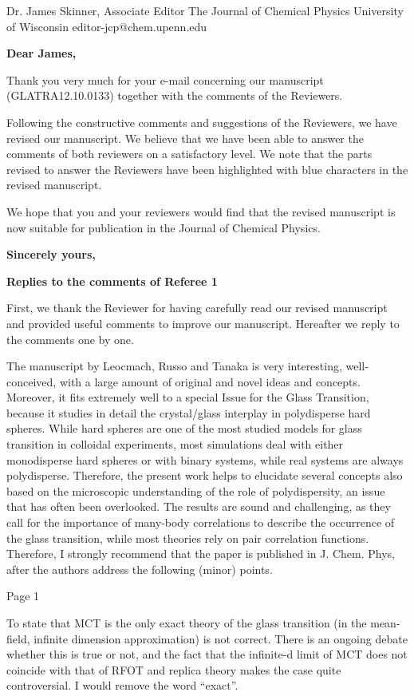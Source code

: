\documentclass[a4paper, rebuttal, parskip=true, firsthead=false, fromemail=true, foldmarks=false]{scrlttr2}
\begin{document}
 
\begin{letter}{Dr. James Skinner, Associate Editor
The Journal of Chemical Physics
University of Wisconsin
editor-jcp@chem.upenn.edu }
\opening{\bf Dear James,}

Thank you very much for your e-mail concerning our manuscript (GLATRA12.10.0133) together with the comments of the Reviewers.

Following the constructive comments and suggestions of the Reviewers, we have revised our manuscript. 
We believe that we have been able to answer the comments of both reviewers on a satisfactory level. We note that the parts revised to answer the Reviewers have been highlighted with blue characters in the revised manuscript. 


We hope that you and your reviewers would find that the revised manuscript is now suitable for publication in the Journal of Chemical Physics. 

\closing{\bf Sincerely yours,} 
\clearpage

\textsf{\textbf{Replies to the comments of Referee 1}}

First, we thank the Reviewer for having carefully read our revised manuscript and provided useful comments to improve our manuscript. 
Hereafter we reply to the comments one by one.

\begin{quotationi}
The manuscript by Leocmach, Russo and Tanaka is very interesting, well-conceived, with a large amount of original and novel ideas and concepts. Moreover, it fits extremely well to a special Issue for the Glass Transition, because it studies in detail the crystal/glass interplay in polydisperse hard spheres. While hard spheres are one of the most studied models for glass transition in colloidal experiments, most simulations deal with either monodisperse hard spheres or with binary systems, while real systems are always polydisperse. Therefore, the present work helps to elucidate several concepts also based on the microscopic understanding of the role of polydispersity, an issue that has often been overlooked. The results are sound and challenging, as they call for the importance of many-body correlations to describe the occurrence of the glass transition, while most theories rely on pair correlation functions. Therefore, I strongly recommend that the paper is published in J. Chem.
Phys, after the authors address the following (minor) points.


Page 1

To state that MCT is the only exact theory of the glass transition (in the mean-field, infinite dimension approximation) is not correct. There is an ongoing debate whether this is true or not, and the fact that the infinite-d limit of MCT does not coincide with that of RFOT and replica theory makes the case quite controversial. I would remove the word ``exact''.
\end{quotationi}


\end{letter}
\end{document}
